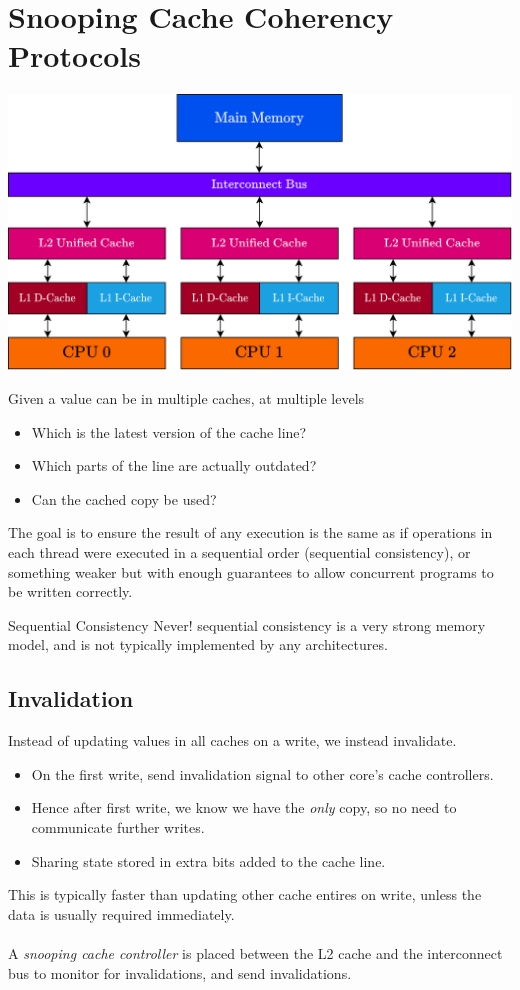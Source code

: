 \section{Snooping Cache Coherency Protocols}
\begin{center}
	\includegraphics[width=.8\textwidth]{parallel_programming/images/basic_cache_hierarchy.drawio.png}
\end{center}
Given a value can be in multiple caches, at multiple levels
\begin{itemize}
	\item Which is the latest version of the cache line?
	\item Which parts of the line are actually outdated?
	\item Can the cached copy be used?
\end{itemize}
The goal is to ensure the result of any execution is the same as if operations in each thread were executed in a sequential order (sequential consistency), or something weaker but with enough guarantees to allow concurrent programs to be written correctly.
\begin{sidenotebox}{Sequential Consistency Never!}
	sequential consistency is a very strong memory model, and is not typically implemented by any architectures.
\end{sidenotebox}

\subsection{Invalidation}
Instead of updating values in all caches on a write, we instead invalidate.
\begin{itemize}
	\item On the first write, send invalidation signal to other core's cache controllers.
	\item Hence after first write, we know we have the \textit{only} copy, so no need to communicate further writes.
	\item Sharing state stored in extra bits added to the cache line.
\end{itemize}
This is typically faster than updating other cache entires on write, unless the data is usually required immediately.
\\
\\ A \textit{snooping cache controller} is placed between the L2 cache and the interconnect bus to monitor for invalidations, and send invalidations.

